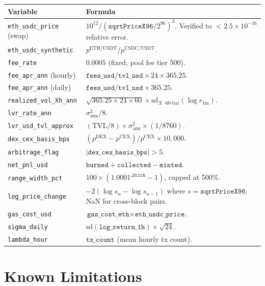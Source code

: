 \documentclass[11pt,a4paper]{article}
\begin{document}
\begin{xltabular}{\linewidth}{L{4.5cm}Y}
\toprule
\textbf{Variable} & \textbf{Formula} \\
\midrule
\texttt{eth\_usdc\_price} (swap) &
  $10^{12} / (\texttt{sqrtPriceX96} / 2^{96})^2$.
  Verified to $< 2.5 \times 10^{-16}$ relative error. \\
\texttt{eth\_usdc\_synthetic} &
  $p^{\mathrm{ETH/USDT}} / p^{\mathrm{USDC/USDT}}$. \\
\texttt{fee\_rate} &
  $0.0005$ (fixed; pool fee tier 500). \\
\texttt{fee\_apr\_ann} (hourly) &
  $\texttt{fees\_usd} / \texttt{tvl\_usd} \times 24 \times 365.25$. \\
\texttt{fee\_apr\_ann} (daily) &
  $\texttt{fees\_usd} / \texttt{tvl\_usd} \times 365.25$. \\
\texttt{realized\_vol\_Xh\_ann} &
  $\sqrt{365.25 \times 24 \times 60} \times
  \mathrm{sd}_{X \cdot 60\text{-bar}}(\log r_{1\mathrm{m}})$. \\
\texttt{lvr\_rate\_ann} &
  $\sigma^2_{\mathrm{ann}} / 8$. \\
\texttt{lvr\_usd\_tvl\_approx} &
  $(\mathrm{TVL}/8) \times \sigma^2_{\mathrm{ann}} \times (1/8760)$. \\
\texttt{dex\_cex\_basis\_bps} &
  $(p^{\mathrm{DEX}} - p^{\mathrm{CEX}}) / p^{\mathrm{CEX}} \times 10{,}000$. \\
\texttt{arbitrage\_flag} &
  $|\texttt{dex\_cex\_basis\_bps}| > 5$. \\
\texttt{net\_pnl\_usd} &
  $\texttt{burned} + \texttt{collected} - \texttt{minted}$. \\
\texttt{range\_width\_pct} &
  $100 \times (1.0001^{\Delta\texttt{tick}} - 1)$, capped at 500\%. \\
\texttt{log\_price\_change} &
  $-2(\log s_n - \log s_{n-1})$ where $s = \texttt{sqrtPriceX96}$;
  NaN for cross-block pairs. \\
\texttt{gas\_cost\_usd} &
  $\texttt{gas\_cost\_eth} \times \texttt{eth\_usdc\_price}$. \\
\texttt{sigma\_daily} &
  $\mathrm{sd}(\texttt{log\_return\_1h}) \times \sqrt{24}$. \\
\texttt{lambda\_hour} &
  $\overline{\texttt{tx\_count}}$ (mean hourly tx count). \\
\bottomrule
\end{xltabular}

\section{Known Limitations}
\label{sec:limits}
\end{document}

